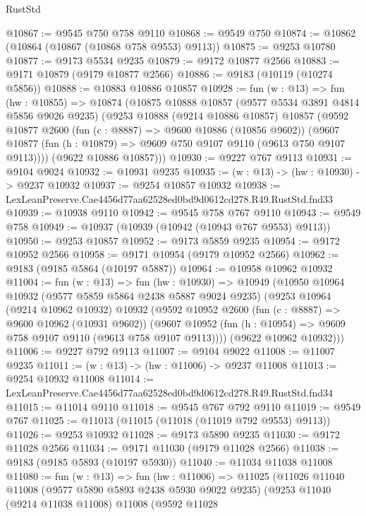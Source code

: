 \begin{lexlean}{RustStd}
\begin{coremodule}
@10867 := @9545 @750 @758 @9110
@10868 := @9549 @750
@10874 := @10862 (@10864 (@10867 (@10868 @758 @9553) @9113))
@10875 := @9253 @10780
@10877 := @9173 @5534 @9235
@10879 := @9172 @10877 @2566
@10883 := @9171 @10879 (@9179 @10877 @2566)
@10886 := @9183 (@10119 (@10274 @5856))
@10888 := @10883 @10886 @10857
@10928 := fun (w : @13) =>
  fun (hw : @10855) =>
  @10874
    (@10875
      @10888
      @10857
      (@9577 @5534 @3891 @4814 @5856 @9026 @9235)
      (@9253
        @10888
        (@9214 @10886 @10857)
        @10857
        (@9592
          @10877
          @2600
          (fun (c : @8887) => @9600 @10886 (@10856 @9602))
          (@9607 @10877 (fun (h : @10879) => @9609 @750 @9107 @9110 (@9613 @750 @9107 @9113))))
        (@9622 @10886 @10857)))
@10930 := @9227 @767 @9113
@10931 := @9104 @9024
@10932 := @10931 @9235
@10935 := (w : @13) -> (hw : @10930) -> @9237 @10932
@10937 := @9254 @10857 @10932
@10938 := LexLeanPreserve.Cae4456d77aa62528ed0bd9d0612cd278.R49.RustStd.fnd33
@10939 := @10938 @9110
@10942 := @9545 @758 @767 @9110
@10943 := @9549 @758
@10949 := @10937 (@10939 (@10942 (@10943 @767 @9553) @9113))
@10950 := @9253 @10857
@10952 := @9173 @5859 @9235
@10954 := @9172 @10952 @2566
@10958 := @9171 @10954 (@9179 @10952 @2566)
@10962 := @9183 (@9185 @5864 (@10197 @5887))
@10964 := @10958 @10962 @10932
@11004 := fun (w : @13) =>
  fun (hw : @10930) =>
  @10949
    (@10950
      @10964
      @10932
      (@9577 @5859 @5864 @2438 @5887 @9024 @9235)
      (@9253
        @10964
        (@9214 @10962 @10932)
        @10932
        (@9592
          @10952
          @2600
          (fun (c : @8887) => @9600 @10962 (@10931 @9602))
          (@9607 @10952 (fun (h : @10954) => @9609 @758 @9107 @9110 (@9613 @758 @9107 @9113))))
        (@9622 @10962 @10932)))
@11006 := @9227 @792 @9113
@11007 := @9104 @9022
@11008 := @11007 @9235
@11011 := (w : @13) -> (hw : @11006) -> @9237 @11008
@11013 := @9254 @10932 @11008
@11014 := LexLeanPreserve.Cae4456d77aa62528ed0bd9d0612cd278.R49.RustStd.fnd34
@11015 := @11014 @9110
@11018 := @9545 @767 @792 @9110
@11019 := @9549 @767
@11025 := @11013 (@11015 (@11018 (@11019 @792 @9553) @9113))
@11026 := @9253 @10932
@11028 := @9173 @5890 @9235
@11030 := @9172 @11028 @2566
@11034 := @9171 @11030 (@9179 @11028 @2566)
@11038 := @9183 (@9185 @5893 (@10197 @5930))
@11040 := @11034 @11038 @11008
@11080 := fun (w : @13) =>
  fun (hw : @11006) =>
  @11025
    (@11026
      @11040
      @11008
      (@9577 @5890 @5893 @2438 @5930 @9022 @9235)
      (@9253
        @11040
        (@9214 @11038 @11008)
        @11008
        (@9592
          @11028

\end{coremodule}
\end{lexlean}
